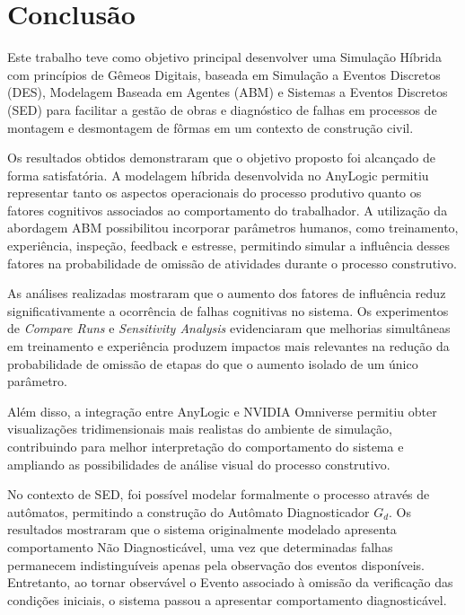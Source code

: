 \chapter{Conclusão}

\label{chap:conclusao}

Este trabalho teve como objetivo principal desenvolver uma Simulação Híbrida com princípios de Gêmeos Digitais, baseada em Simulação a Eventos Discretos (DES), Modelagem Baseada em Agentes (ABM) e Sistemas a Eventos Discretos (SED) para facilitar a gestão de obras e diagnóstico de falhas em processos de montagem e desmontagem de fôrmas em um contexto de construção civil.

Os resultados obtidos demonstraram que o objetivo proposto foi alcançado de forma satisfatória. A modelagem híbrida desenvolvida no AnyLogic permitiu representar tanto os aspectos operacionais do processo produtivo quanto os fatores cognitivos associados ao comportamento do trabalhador. A utilização da abordagem ABM possibilitou incorporar parâmetros humanos, como treinamento, experiência, inspeção, feedback e estresse, permitindo simular a influência desses fatores na probabilidade de omissão de atividades durante o processo construtivo. 

As análises realizadas mostraram que o aumento dos fatores de influência reduz significativamente a ocorrência de falhas cognitivas no sistema. Os experimentos de \textit{Compare Runs} e \textit{Sensitivity Analysis} evidenciaram que melhorias simultâneas em treinamento e experiência produzem impactos mais relevantes na redução da probabilidade de omissão de etapas do que o aumento isolado de um único parâmetro.

Além disso, a integração entre AnyLogic e NVIDIA Omniverse permitiu obter visualizações tridimensionais mais realistas do ambiente de simulação, contribuindo para melhor interpretação do comportamento do sistema e ampliando as possibilidades de análise visual do processo construtivo.

No contexto de SED, foi possível modelar formalmente o processo através de autômatos, permitindo a construção do Autômato Diagnosticador $G_d$. Os resultados mostraram que o sistema originalmente modelado apresenta comportamento Não Diagnosticável, uma vez que determinadas falhas permanecem indistinguíveis apenas pela observação dos eventos disponíveis. Entretanto, ao tornar observável o Evento associado à omissão da verificação das condições iniciais, o sistema passou a apresentar comportamento diagnosticável.


